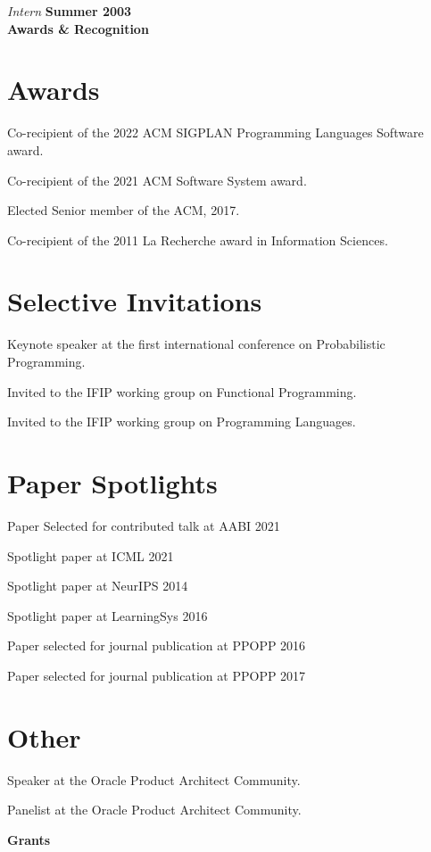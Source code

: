 \documentclass[margin,line]{res}
\begin{document}
\begin{resume}
\vspace{-.4cm}
{\em Intern} \hfill {\bf Summer 2003}\\

\newpage
{\bf {\Large Awards \& Recognition}}

\section{\sc Awards}

Co-recipient of the 2022 ACM SIGPLAN Programming Languages Software award.

Co-recipient of the 2021 ACM Software System award.

Elected Senior member of the ACM, 2017.

Co-recipient of the 2011 La Recherche award in Information Sciences.

\section{\sc Selective Invitations}

Keynote speaker at the first international conference on Probabilistic Programming. 

Invited to the IFIP working group on Functional Programming.

Invited to the IFIP working group on Programming Languages.

\section{\sc Paper Spotlights}

Paper Selected for contributed talk at AABI 2021

Spotlight paper at ICML 2021

Spotlight paper at NeurIPS 2014

Spotlight paper at LearningSys 2016

Paper selected for journal publication at PPOPP 2016

Paper selected for journal publication at PPOPP 2017

\section{\sc Other}

Speaker at the Oracle Product Architect Community.

Panelist at the Oracle Product Architect Community.

\newpage
{\bf {\Large Grants}}


\end{resume}
\end{document}
